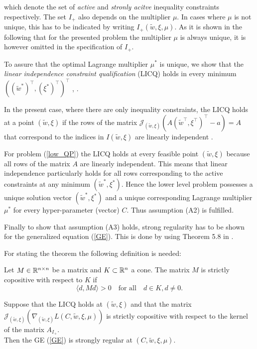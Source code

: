 which denote the set of \emph{active} and \emph{stronly acitve} inequality constraints respectively.
The set \(I_+\) also depends on the multiplier \(\mu\). In cases where \(\mu\) is not unique, this has to be indicated by writing \(I_+(\tilde{w},\xi,\mu)\).  As it is shown in the following that for the presented problem the multiplier \(\mu\) is always unique, it is however omitted in the specification of \(I_+\). 

To assure that the optimal Lagrange multiplier \(\mu^*\) is unique, we show that the \emph{linear independence constraint qualification} (LICQ) holds in every minimum  \(((\tilde{w}^*)^{\top},(\xi^*)^{\top})^{\top}\) \cite[Theorem 4.8, p. 82]{Outrata1998}, \cite[Theorem 1, p. 3]{Wachsmuth2013}.

In the present case, where there are only inequality constraints, the LICQ holds at a point \((\tilde{w},\xi)\) if the rows of the matrix \(\mathcal{J}_{(\tilde{w},\xi)}\left(A(\tilde{w}^{\top},\xi^{\top})^{\top} - a\right) = A\) that correspond to the indices in \(I(\tilde{w},\xi)\) are linearly independent \cite[p. 82, 96]{Outrata1998}.

For problem (\ref{low_QP}) the LICQ holds at every feasible point \((\tilde{w},\xi)\) because all rows of the matrix \(A\) are linearly independent. This means that linear independence particularly holds for all rows corresponding to the active constraints at any minimum \((\tilde{w}^*,\xi^*)\).
Hence the lower level problem possesses a unique solution vector \((\tilde{w}^*,\xi^*)\) and a unique corresponding Lagrange multiplier \(\mu^*\) for every hyper-parameter (vector) \(C\). Thus assumption (A2) is fulfilled.


Finally to show that assumption (A3) holds, strong regularity has to be shown for the generalized equation (\ref{GE}).
This is done by using Theorem 5.8 in \cite[p. 96]{Outrata1998}.

For stating the theorem the following definition is needed:
\begin{definition}
	Let \(M \in \mathbb{R}^{n\times n}\) be a matrix and \(K \subset \mathbb{R}^n\) a cone. The matrix \(M\) is strictly copositive with respect to \(K\) if 
	\[ \langle d,Md \rangle > 0 \quad \text{for all} \quad d \in K, d\neq 0. \]
\end{definition}

\begin{theorem}
	Suppose that the LICQ holds at \((\tilde{w},\xi)\) and that the matrix \(\mathcal{J}_{(\tilde{w},\xi)}\left(\nabla_{(\tilde{w},\xi)}L(C,\tilde{w},\xi,\mu)\right)\) is strictly copositive with respect to the kernel of the matrix \(A_{I_+}\). \\
	Then the GE (\ref{GE}) is strongly regular at \((C,\tilde{w},\xi,\mu)\).
\end{theorem}

